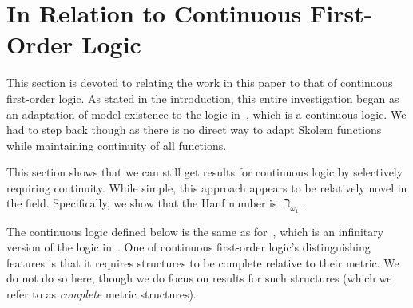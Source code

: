 \documentclass{amsart}
\theoremstyle{definition}
\numberwithin{equation}{theorem}
\begin{document}
\section{In Relation to Continuous First-Order Logic}
\newcommand{\Tcont}{{T_\text{cont}}}
\newcommand{\Td}{{T_d}}
This section is devoted to relating the work in this paper to that of continuous first-order logic.
As stated in the introduction, this entire investigation began as an adaptation of model existence to the logic in~\cite{eagle2014omitting}, which is a continuous logic.
We had to step back though as there is no direct way to adapt Skolem functions while maintaining continuity of all functions.

This section shows that we can still get results for continuous logic by selectively requiring continuity.
While simple, this approach appears to be relatively novel in the field.
Specifically, we show that the Hanf number is $\beth_{\omega_1}$.

The continuous logic defined below is the same as for~\cite{eagle2014omitting}, which is an infinitary version of the logic in~\cite{yaacov2008model}.
One of continuous first-order logic's distinguishing features is that it requires structures to be complete relative to their metric.
We do not do so here, though we do focus on results for such structures (which we refer to as \emph{complete} metric structures).
\end{document}
